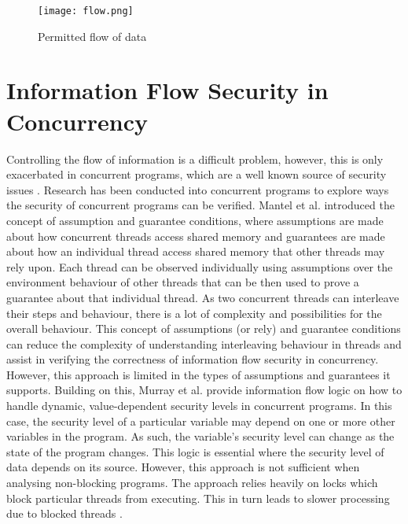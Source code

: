 \begin{figure}
    \centering
    \texttt{[image: flow.png]}
    \caption{Permitted flow of data}
    \label{fig:flow}
\end{figure}

\section{Information Flow Security in Concurrency}
Controlling the flow of information is a difficult problem, however, this is only exacerbated in concurrent programs, which are a well known source of security issues \cite{mantel2014noninterference}\cite{smith2019value}\cite{vaughan2012secure}. Research has been conducted into concurrent programs to explore ways the security of concurrent programs can be verified. Mantel et al. \cite{mantel2011assumptions} introduced the concept of assumption and guarantee conditions, where assumptions are made about how concurrent threads access shared memory and guarantees are made about how an individual thread access shared memory that other threads may rely upon. Each thread can be observed individually using assumptions over the environment behaviour of other threads that can be then used to prove a guarantee about that individual thread. As two concurrent threads can interleave their steps and behaviour, there is a lot of complexity and possibilities for the overall behaviour. This concept of assumptions (or rely) and guarantee conditions can reduce the complexity of understanding interleaving behaviour in threads and assist in verifying the correctness of information flow security in concurrency. However, this approach is limited in the types of assumptions and guarantees it supports. Building on this, Murray et al. \cite{ernst2019seccsl} \cite{murray2018covern} provide information flow logic on how to handle dynamic, value-dependent security levels in concurrent programs. In this case, the security level of a particular variable may depend on one or more other variables in the program. As such, the variable's security level can change as the state of the program changes. This logic is essential where the security level of data depends on its source. However, this approach is not sufficient when analysing non-blocking programs. The approach relies heavily on locks which block particular threads from executing. This in turn leads to slower processing due to blocked threads \cite{prakash1991non}.

